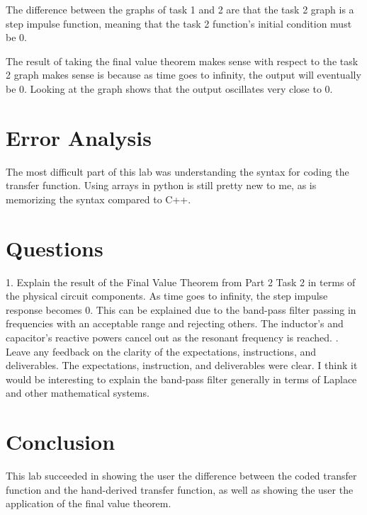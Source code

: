 \documentclass[12pt]{article}
\begin{document}
The difference between the graphs of task 1 and 2 are that the task 2 graph is a step impulse function, meaning that the task 2 function's initial condition must be 0.

The result of taking the final value theorem makes sense with respect to the task 2 graph makes sense is because as time goes to infinity, the output will eventually be 0. Looking at the graph shows that the output oscillates very close to 0. 
\section{Error Analysis}
The most difficult part of this lab was understanding the syntax for coding the transfer function. Using arrays in python is still pretty new to me, as is memorizing the syntax compared to C++.
\section{Questions}
1. Explain the result of the Final Value Theorem from Part 2 Task 2 in terms of the physical
circuit components.
\newline
As time goes to infinity, the step impulse response becomes 0. This can be explained due to the band-pass filter passing in frequencies with an acceptable range and rejecting others. The inductor's and capacitor's reactive powers cancel out as the resonant frequency is reached.
. Leave any feedback on the clarity of the expectations, instructions, and deliverables.\newline
The expectations, instruction, and deliverables were clear. I think it would be interesting to explain the band-pass filter generally in terms of Laplace and other mathematical systems.
\section{Conclusion}
This lab succeeded in showing the user the difference between the coded transfer function and the hand-derived transfer function, as well as showing the user the application of the final value theorem.
\end{document}
